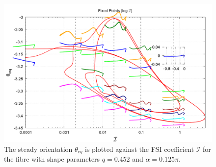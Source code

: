 \documentclass[lineno]{JFM-FLM_Au}
\begin{document}
\begin{figure}[!h]
	\begin{center}
		\includegraphics[width=1\textwidth]{plot/logx_combine_elastic_beam_I_theta_q_0.452_alpha_0.125pi_initial_-4.80_0.png}
		\caption{The steady orientation $\theta_{eq}$ is plotted against the FSI coefficient $\mathcal{I}$ for the fibre with shape parameters $q = 0.452$ and $\alpha = 0.125\pi$.}
	\end{center}
\end{figure}
\end{document}
